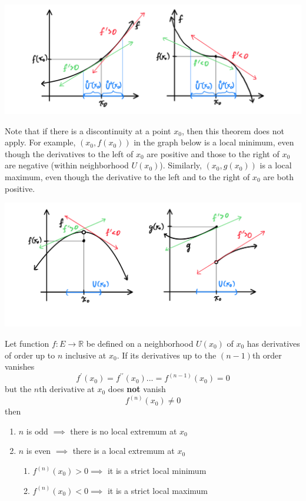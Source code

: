 \documentclass{article}
\begin{document}
\begin{theorem}
\begin{enumerate}
      \begin{center}
          \includegraphics[scale=0.25]{img/No_Extremum.PNG}
      \end{center}
    \end{enumerate}
    \end{theorem}

    Note that if there is a discontinuity at a point $x_0$, then this theorem does not apply. For example, $(x_0, f(x_0))$ in the graph below is a local minimum, even though the derivatives to the left of $x_0$ are positive and those to the right of $x_0$ are negative (within neighborhood $U(x_0)$). Similarly, $(x_0, g(x_0))$ is a local maximum, even though the derivative to the left and to the right of $x_0$ are both positive. 
    \begin{center}
        \includegraphics[scale=0.3]{img/Theorem_not_apply_if_Discontinuity.PNG}
    \end{center}

    \begin{proposition}
    Let function $f: E \longrightarrow \mathbb{R}$ be defined on a neighborhood $U(x_0)$ of $x_0$ has derivatives of order up to $n$ inclusive at $x_0$. If its derivatives up to the $(n-1)$th order vanishes 
    \[f^\prime (x_0) = f^{\prime\prime} (x_0) ... = f^{(n-1)} (x_0) = 0\]
    but the $n$th derivative at $x_0$ does \textbf{not} vanish
    \[f^{(n)} (x_0) \neq 0\]
    then 
    \begin{enumerate}
      \item $n$ is odd $\implies$ there is no local extremum at $x_0$ 
      \item $n$ is even $\implies$ there is a local extremum at $x_0$
      \begin{enumerate}
        \item $f^{(n)} (x_0) > 0 \implies$ it is a strict local minimum
        \item $f^{(n)} (x_0) < 0 \implies$ it is a strict local maximum
      \end{enumerate}
    \end{enumerate}
    \end{proposition}
\end{document}
